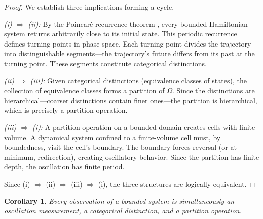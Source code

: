 \documentclass[twocolumn,10pt,a4paper]{article}
\newtheorem{corollary}[theorem]{Corollary}
\theoremstyle{definition}
\theoremstyle{remark}
\begin{document}
\begin{proof}
We establish three implications forming a cycle.

\emph{(i) $\Rightarrow$ (ii):} By the Poincar\'e recurrence theorem \citep{Strogatz1994}, every bounded Hamiltonian system returns arbitrarily close to its initial state. This periodic recurrence defines turning points in phase space. Each turning point divides the trajectory into distinguishable segments---the trajectory's future differs from its past at the turning point. These segments constitute categorical distinctions.

\emph{(ii) $\Rightarrow$ (iii):} Given categorical distinctions (equivalence classes of states), the collection of equivalence classes forms a partition of $\Omega$. Since the distinctions are hierarchical---coarser distinctions contain finer ones---the partition is hierarchical, which is precisely a partition operation.

\emph{(iii) $\Rightarrow$ (i):} A partition operation on a bounded domain creates cells with finite volume. A dynamical system confined to a finite-volume cell must, by boundedness, visit the cell's boundary. The boundary forces reversal (or at minimum, redirection), creating oscillatory behavior. Since the partition has finite depth, the oscillation has finite period.

Since (i) $\Rightarrow$ (ii) $\Rightarrow$ (iii) $\Rightarrow$ (i), the three structures are logically equivalent.
\end{proof}

\begin{corollary}
Every observation of a bounded system is simultaneously an oscillation measurement, a categorical distinction, and a partition operation.
\end{corollary}
\end{document}

